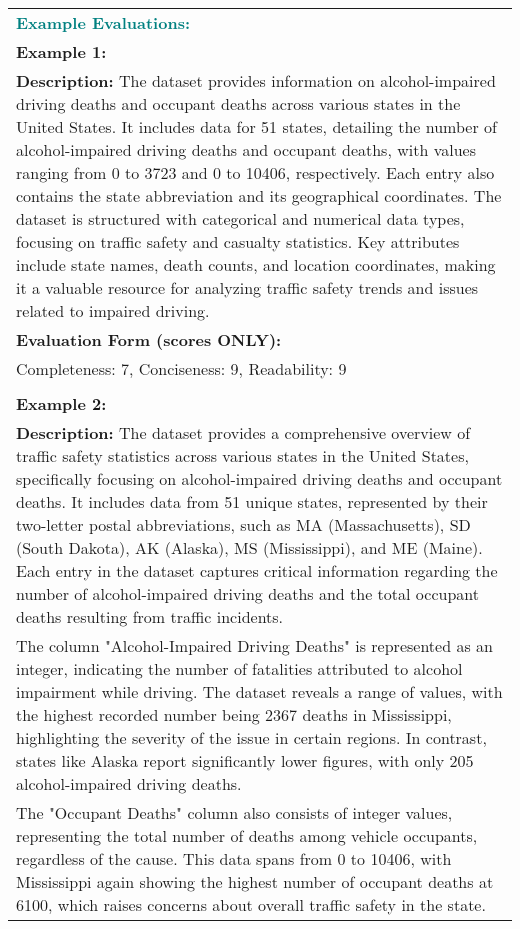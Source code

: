 \begin{table*}
\begin{tabular}{p{14cm}}
    \\
    \textcolor{teal}{\textbf{Example Evaluations:}} \\
    \textbf{Example 1:} \\
    \textbf{Description:} The dataset provides information on alcohol-impaired driving deaths and occupant deaths across various states in the United States. It includes data for 51 states, detailing the number of alcohol-impaired driving deaths and occupant deaths, with values ranging from 0 to 3723 and 0 to 10406, respectively. Each entry also contains the state abbreviation and its geographical coordinates. The dataset is structured with categorical and numerical data types, focusing on traffic safety and casualty statistics. Key attributes include state names, death counts, and location coordinates, making it a valuable resource for analyzing traffic safety trends and issues related to impaired driving. \\
    \textbf{Evaluation Form (scores ONLY):} \\
    Completeness: 7, Conciseness: 9, Readability: 9 \\
    \\
    \textbf{Example 2:} \\
    \textbf{Description:} The dataset provides a comprehensive overview of traffic safety statistics across various states in the United States, specifically focusing on alcohol-impaired driving deaths and occupant deaths. It includes data from 51 unique states, represented by their two-letter postal abbreviations, such as MA (Massachusetts), SD (South Dakota), AK (Alaska), MS (Mississippi), and ME (Maine). Each entry in the dataset captures critical information regarding the number of alcohol-impaired driving deaths and the total occupant deaths resulting from traffic incidents. \\
    The column "Alcohol-Impaired Driving Deaths" is represented as an integer, indicating the number of fatalities attributed to alcohol impairment while driving. The dataset reveals a range of values, with the highest recorded number being 2367 deaths in Mississippi, highlighting the severity of the issue in certain regions. In contrast, states like Alaska report significantly lower figures, with only 205 alcohol-impaired driving deaths. \\
    The "Occupant Deaths" column also consists of integer values, representing the total number of deaths among vehicle occupants, regardless of the cause. This data spans from 0 to 10406, with Mississippi again showing the highest number of occupant deaths at 6100, which raises concerns about overall traffic safety in the state. \\

\end{tabular}
\end{table*}
